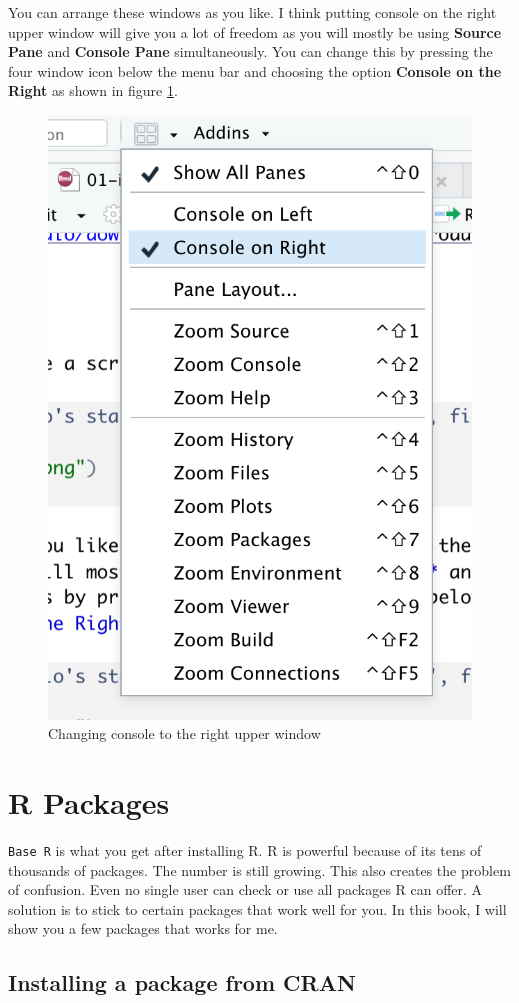 \documentclass[
]{book}
\begin{document}
You can arrange these windows as you like. I think putting console on the right upper window will give you a lot of freedom as you will mostly be using \textbf{Source Pane} and \textbf{Console Pane} simultaneously. You can change this by pressing the four window icon below the menu bar and choosing the option \textbf{Console on the Right} as shown in figure \ref{fig:consoleright}.

\begin{figure}

{\centering \includegraphics[width=0.5\linewidth]{img/consoleright} 

}

\caption{Changing console to the right upper window}\label{fig:consoleright}
\end{figure}

\hypertarget{r-packages}{%
\section{R Packages}\label{r-packages}}

\texttt{Base\ R} is what you get after installing R. R is powerful because of its tens of thousands of packages. The number is still growing. This also creates the problem of confusion. Even no single user can check or use all packages R can offer. A solution is to stick to certain packages that work well for you. In this book, I will show you a few packages that works for me.

\hypertarget{installing-a-package-from-cran}{%
\subsection{Installing a package from CRAN}\label{installing-a-package-from-cran}}
\end{document}
